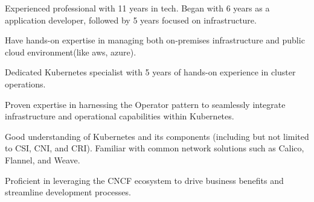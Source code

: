 

\begin{cvparagraph}

Experienced professional with 11 years in tech. Began with 6 years as a application developer, followed by 5 years focused on infrastructure. 

Have hands-on expertise in managing both on-premises infrastructure and public cloud environment(like aws, azure).

Dedicated Kubernetes specialist with 5 years of hands-on experience in cluster operations.

Proven expertise in harnessing the Operator pattern to seamlessly integrate infrastructure and operational capabilities within Kubernetes.

Good understanding of Kubernetes and its components (including but not limited to CSI, CNI, and CRI). Familiar with common network solutions such as Calico, Flannel, and Weave.

Proficient in leveraging the CNCF ecosystem to drive business benefits and streamline development processes.
 




\end{cvparagraph}



